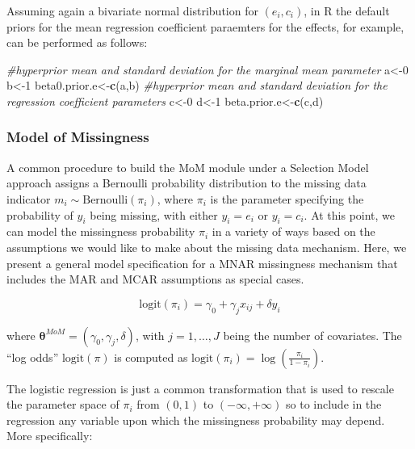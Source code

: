 \documentclass[]{article}
\newenvironment{Shaded}{\begin{snugshade}}{\end{snugshade}}
\newcommand{\KeywordTok}[1]{\textcolor[rgb]{0.13,0.29,0.53}{\textbf{{#1}}}}
\newcommand{\DecValTok}[1]{\textcolor[rgb]{0.00,0.00,0.81}{{#1}}}
\newcommand{\CommentTok}[1]{\textcolor[rgb]{0.56,0.35,0.01}{\textit{{#1}}}}
\newcommand{\NormalTok}[1]{{#1}}
\begin{document}
Assuming again a bivariate normal distribution for \((e_{i},c_{i})\), in
R the default priors for the mean regression coefficient paraemters for
the effects, for example, can be performed as follows:

\begin{Shaded}
\begin{Highlighting}[]
\CommentTok{#hyperprior mean and standard deviation for the marginal mean parameter}
\NormalTok{a<-}\DecValTok{0}
\NormalTok{b<-}\DecValTok{1}
\NormalTok{beta0.prior.e<-}\KeywordTok{c}\NormalTok{(a,b)}
\CommentTok{#hyperprior mean and standard deviation for the regression coefficient parameters}
\NormalTok{c<-}\DecValTok{0}
\NormalTok{d<-}\DecValTok{1}
\NormalTok{beta.prior.e<-}\KeywordTok{c}\NormalTok{(c,d)}
\end{Highlighting}
\end{Shaded}

\subsubsection{\texorpdfstring{Model of
Missingness\label{MoM}}{Model of Missingness}}\label{model-of-missingness}

A common procedure to build the MoM module under a Selection Model
approach assigns a Bernoulli probability distribution to the missing
data indicator \(m_{i} \sim \mbox{Bernoulli}(\pi_{i})\), where
\(\pi_{i}\) is the parameter specifying the probability of \(y_{i}\)
being missing, with either \(y_{i}=e_{i}\) or \(y_{i}=c_{i}\). At this
point, we can model the missingness probability \(\pi_{i}\) in a variety
of ways based on the assumptions we would like to make about the missing
data mechanism. Here, we present a general model specification for a
MNAR missingness mechanism that includes the MAR and MCAR assumptions as
special cases.

\begin{equation}\label{eqSM2}
\mbox{logit}(\pi_{i})=\gamma_{0}+\gamma_{j}x_{ij}+\delta y_{i}
\end{equation}

where \(\bm{\theta}^{MoM}=(\gamma_{0},\gamma_{j},\delta)\), with
\(j=1,\ldots,J\) being the number of covariates. The ``log odds''
\(\mbox{logit}(\pi)\) is computed as
\(\mbox{logit}(\pi_{i})=\log \left({\frac{\pi_{i}}{1-\pi_{i}}}\right)\).

The logistic regression is just a common transformation that is used to
rescale the parameter space of \(\pi_{i}\) from \((0,1)\) to
\((-\infty,+\infty)\) so to include in the regression any variable upon
which the missingness probability may depend. More specifically:
\end{document}
